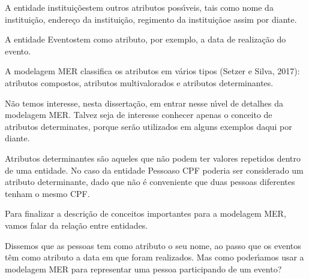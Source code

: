 \documentclass[
12pt,		%
openright,	%
twoside,  %
a4paper,			%
chapter=TITLE,		%
english,			%
french,				%
spanish,			%
brazil				%
]{USPSC-classe/USPSC}
\begin{document}
A entidade \textquotedbl institui\c{c}\~oes\textquotedbl  tem outros atributos poss\'{\i}veis, tais como \textquotedbl nome da institui\c{c}\~ao\textquotedbl , \textquotedbl endere\c{c}o da institui\c{c}\~ao\textquotedbl , \textquotedbl regimento da institui\c{c}\~ao\textquotedbl  e assim por diante.









A entidade \textquotedbl Eventos\textquotedbl  tem como atributo, por exemplo, a data de realiza\c{c}\~ao do evento.









A modelagem MER classifica os atributos em v\'arios tipos (Setzer e Silva, 2017): atributos compostos, atributos multivalorados e atributos determinantes.









N\~ao temos interesse, nesta disserta\c{c}\~ao, em entrar nesse n\'{\i}vel de detalhes da modelagem MER. Talvez seja de interesse conhecer apenas o conceito de \textquotedbl atributos determinates\textquotedbl , porque ser\~ao utilizados em alguns exemplos daqui por diante.









Atributos determinantes s\~ao aqueles que n\~ao podem ter valores repetidos dentro de uma entidade. No caso da entidade \textquotedbl Pessoas\textquotedbl  o CPF poderia ser considerado um atributo determinante, dado que n\~ao \'e conveniente que duas pessoas diferentes tenham o mesmo CPF.









Para finalizar a descri\c{c}\~ao de conceitos importantes para a modelagem MER, vamos falar da rela\c{c}\~ao entre entidades.









Dissemos que as pessoas tem como atributo o seu nome, ao passo que os eventos t\^em como atributo a data em que foram realizados. Mas como poder\'{\i}amos usar a modelagem MER para representar uma pessoa participando de um evento?
\end{document}

